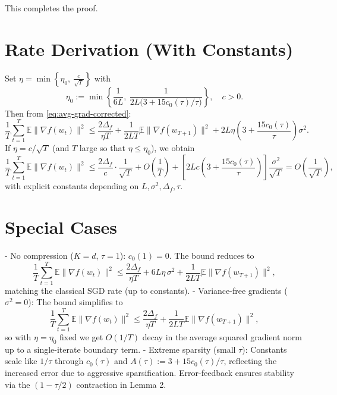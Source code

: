 \documentclass[11pt]{article}
\newcommand{\E}{\mathbb{E}}
\begin{document}

This completes the proof.

\section*{Rate Derivation (With Constants)}
Set $\eta = \min\left\{\eta_0,\ \frac{c}{\sqrt{T}}\right\}$ with
\[
\eta_0 := \min\left\{ \frac{1}{6L},\ \frac{1}{2L\bigl(3 + 15 c_0(\tau)/\tau\bigr)}\right\},\quad c>0.
\]
Then from \eqref{eq:avg-grad-corrected}:
\[
\frac{1}{T}\sum_{t=1}^T \E\|\nabla f(w_t)\|^2
\le \frac{2\Delta_f}{\eta T}
+ \frac{1}{2LT}\E\|\nabla f(w_{T+1})\|^2
+ 2L\eta \left(3 + \frac{15 c_0(\tau)}{\tau}\right)\sigma^2.
\]
If $\eta = c/\sqrt{T}$ (and $T$ large so that $\eta\le \eta_0$), we obtain
\[
\frac{1}{T}\sum_{t=1}^T \E\|\nabla f(w_t)\|^2
\le \frac{2\Delta_f}{c}\cdot \frac{1}{\sqrt{T}}
+ O\!\left(\frac{1}{T}\right)
+ \left[2Lc\left(3 + \frac{15 c_0(\tau)}{\tau}\right)\right]\frac{\sigma^2}{\sqrt{T}}
= O\!\left(\frac{1}{\sqrt{T}}\right),
\]
with explicit constants depending on $L,\sigma^2,\Delta_f,\tau$.

\section*{Special Cases}
- No compression ($K=d$, $\tau=1$): $c_0(1)=0$. The bound reduces to
\[
\frac{1}{T}\sum_{t=1}^T \E\|\nabla f(w_t)\|^2
\le \frac{2\Delta_f}{\eta T} + 6L\eta\,\sigma^2 + \frac{1}{2LT}\E\|\nabla f(w_{T+1})\|^2,
\]
matching the classical SGD rate (up to constants).
- Variance-free gradients ($\sigma^2=0$): The bound simplifies to
\[
\frac{1}{T}\sum_{t=1}^T \E\|\nabla f(w_t)\|^2
\le \frac{2\Delta_f}{\eta T} + \frac{1}{2LT}\E\|\nabla f(w_{T+1})\|^2,
\]
so with $\eta=\eta_0$ fixed we get $O(1/T)$ decay in the average squared gradient norm up to a single-iterate boundary term.
- Extreme sparsity (small $\tau$): Constants scale like $1/\tau$ through $c_0(\tau)$ and $A(\tau):=3 + 15 c_0(\tau)/\tau$, reflecting the increased error due to aggressive sparsification. Error-feedback ensures stability via the $(1-\tau/2)$ contraction in Lemma 2.

\end{document}
